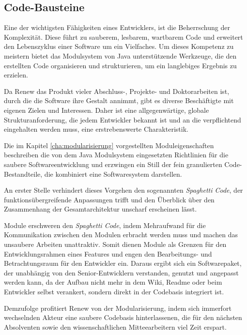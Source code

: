 \subsection{Code-Bausteine}\label{sub:cbs}
Eine der wichtigsten Fähigkeiten eines Entwicklers, ist die Beherrschung der Komplexität. Diese führt zu sauberem, lesbarem, wartbarem Code und erweitert den Lebenszyklus einer Software um ein Vielfaches. Um dieses Kompetenz zu meistern bietet das Modulsystem von Java unterstützende Werkzeuge, die den erstellten Code organisieren und strukturieren, um ein langlebiges Ergebnis zu erzielen.  \newline

Da Renew das Produkt vieler Abschluss-, Projekte- und Doktorarbeiten ist, durch die die Software ihre Gestalt annimmt, gibt es diverse Beschäftigte mit eigenen Zielen und Interessen. Daher ist eine allgegenwärtige, globale Strukturanforderung, die jedem Entwickler bekannt ist und an die verpflichtend eingehalten werden muss, eine erstrebenswerte Charakteristik.  \newline

Die im Kapitel \ref{cha:modularisierung} vorgestellten Moduleigenschaften beschreiben die von dem Java Modulsystem eingesetzten Richtlinien für die saubere Softwareentwicklung und erzwingen ein Still der fein granulierten Code-Bestandteile, die kombiniert eine Softwaresystem darstellen. \newline

An erster Stelle verhindert dieses Vorgehen den sogenannten \textit{Spaghetti Code}, der funktionsübergreifende Anpassungen trifft und den Überblick über den Zusammenhang der Gesamtarchitektur unscharf erscheinen lässt.  \newline

Module erschweren den \textit{Spaghetti Code}, indem Mehraufwand für die Kommunikation zwischen den Modulen erbracht werden muss und machen das unsaubere Arbeiten unattraktiv. Somit dienen Module als Grenzen für den Entwicklungsrahmen eines Features und engen den Bearbeitungs- und Betrachtungsraum für den Entwickler ein. Daraus ergibt sich ein Softwarepaket, der unabhängig von den Senior-Entwicklern verstanden, genutzt und angepasst werden kann, da der Aufbau nicht mehr in dem Wiki, Readme oder beim Entwickler selbst verankert, sondern direkt in der Codebasis integriert ist.  \newline

Demzufolge profitiert Renew von der Modularisierung, indem sich immerfort wechselnden Akteur eine saubere Codebasis hinterlassenen, die für den nächsten Absolventen sowie den wissenschaftlichen Mitteearbeitern viel Zeit erspart. \bigbreak

